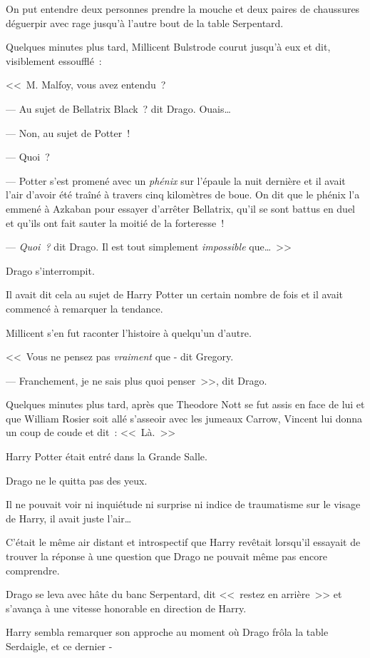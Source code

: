 On put entendre deux personnes prendre la mouche et deux paires de chaussures déguerpir avec rage jusqu'à l'autre bout de la table Serpentard.

Quelques minutes plus tard, Millicent Bulstrode courut jusqu'à eux et dit, visiblement essoufflé~:

<<~M. Malfoy, vous avez entendu~?

--- Au sujet de Bellatrix Black~? dit Drago. Ouais…

--- Non, au sujet de Potter~!

--- Quoi~?

--- Potter s'est promené avec un \emph{phénix} sur l'épaule la nuit dernière et il avait l'air d'avoir été traîné à travers cinq kilomètres de boue. On dit que le phénix l'a emmené à Azkaban pour essayer d'arrêter Bellatrix, qu'il se sont battus en duel et qu'ils ont fait sauter la moitié de la forteresse~!

--- \emph{Quoi~?} dit Drago. Il est tout simplement \emph{impossible} que…~>>

Drago s'interrompit.

Il avait dit cela au sujet de Harry Potter un certain nombre de fois et il avait commencé à remarquer la tendance.

Millicent s'en fut raconter l'histoire à quelqu'un d'autre.

<<~Vous ne pensez pas \emph{vraiment} que - dit Gregory.

--- Franchement, je ne sais plus quoi penser~>>, dit Drago.

Quelques minutes plus tard, après que Theodore Nott se fut assis en face de lui et que William Rosier soit allé s'asseoir avec les jumeaux Carrow, Vincent lui donna un coup de coude et dit~: <<~Là.~>>

Harry Potter était entré dans la Grande Salle.

Drago ne le quitta pas des yeux.

Il ne pouvait voir ni inquiétude ni surprise ni indice de traumatisme sur le visage de Harry, il avait juste l'air…

C'était le même air distant et introspectif que Harry revêtait lorsqu'il essayait de trouver la réponse à une question que Drago ne pouvait même pas encore comprendre.

Drago se leva avec hâte du banc Serpentard, dit <<~restez en arrière~>> et s'avança à une vitesse honorable en direction de Harry.

Harry sembla remarquer son approche au moment où Drago frôla la table Serdaigle, et ce dernier -

